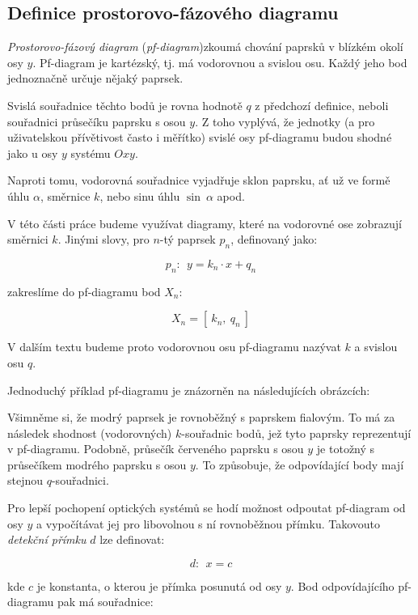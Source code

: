 \subsection{Definice prostorovo-fázového diagramu}

\emph{Prostorovo-fázový diagram} (\emph{pf-diagram})\src zkoumá chování paprsků v blízkém okolí osy $y$. Pf-diagram je kartézský, tj. má vodorovnou a svislou osu. Každý jeho bod jednoznačně určuje nějaký paprsek.

Svislá souřadnice těchto bodů je rovna hodnotě $q$ z předchozí definice, neboli souřadnici průsečíku paprsku s osou $y$. Z toho vyplývá, že jednotky (a pro uživatelskou přívětivost často i měřítko) svislé osy pf-diagramu budou shodné jako u osy $y$ systému $Oxy$.

Naproti tomu, vodorovná souřadnice vyjadřuje sklon paprsku, ať už ve formě úhlu $\alpha$, směrnice $k$, nebo sinu úhlu $\sin\ \alpha$ apod.

V této části práce budeme využívat diagramy, které na vodorovné ose zobrazují směrnici $k$. Jinými slovy, pro $n$-tý paprsek $p_n$, definovaný jako:

\[ p_n:\ \ y = k_n \cdot x + q_n \]

zakreslíme do pf-diagramu bod $X_n$: 

\[ X_n = [\ k_n,\ q_n\ ] \]

V dalším textu budeme proto vodorovnou osu pf-diagramu nazývat $k$ a svislou osu $q$.

Jednoduchý příklad pf-diagramu je znázorněn na následujících obrázcích:


Všimněme si, že modrý paprsek je rovnoběžný s paprskem fialovým. To má za následek shodnost (vodorovných) $k$-souřadnic bodů, jež tyto paprsky reprezentují v pf-diagramu. Podobně, průsečík červeného paprsku s osou $y$ je totožný s průsečíkem modrého paprsku s osou $y$. To způsobuje, že odpovídající body mají stejnou $q$-souřadnici.

Pro lepší pochopení optických systémů se hodí možnost odpoutat pf-diagram od osy $y$ a vypočítávat jej pro libovolnou s ní rovnoběžnou přímku. Takovouto \emph{detekční přímku} $d$ lze definovat:

\[ d:\ \ x = c \]

kde $c$ je konstanta, o kterou je přímka posunutá od osy $y$. Bod odpovídajícího pf-diagramu pak má souřadnice:


